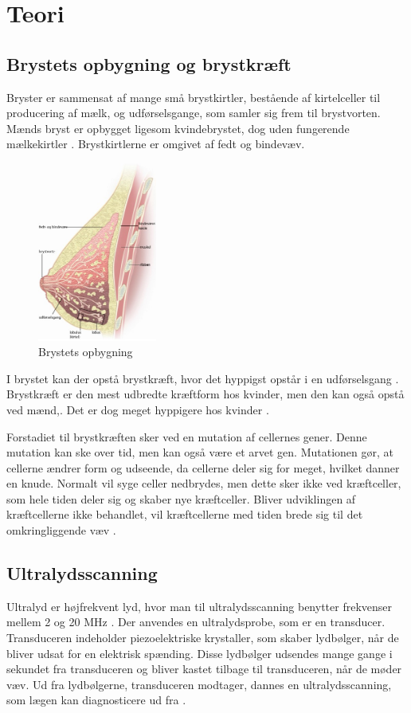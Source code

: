 \chapter{Teori}\label{Teori}

\section{Brystets opbygning og brystkræft}
Bryster er sammensat af mange små brystkirtler, bestående af kirtelceller til producering af mælk, og udførselsgange, som samler sig frem til brystvorten. Mænds bryst er opbygget ligesom kvindebrystet, dog uden fungerende mælkekirtler \cite{Mand}. Brystkirtlerne er omgivet af fedt og bindevæv\citep{Bryst}.

\begin{figure}[H]
    \centering
    \includegraphics[width=0.35\textwidth]{figurer/r/bryst}
    \caption{Brystets opbygning \citep{Bryst}}
    \label{Brystet}
\end{figure}

I brystet kan der opstå brystkræft, hvor det hyppigst opstår i en udførselsgang \citep{Bryst}. Brystkræft er den mest udbredte kræftform hos kvinder, men den kan også opstå ved mænd,. Det er dog meget hyppigere hos kvinder \cite{Mand}.

Forstadiet til brystkræften sker ved en mutation af cellernes gener. Denne mutation kan ske over tid, men kan også være et arvet gen. Mutationen gør, at cellerne ændrer form og udseende, da cellerne deler sig for meget, hvilket danner en knude. Normalt vil syge celler nedbrydes, men dette sker ikke ved kræftceller, som hele tiden deler sig og skaber nye kræftceller. Bliver udviklingen af kræftcellerne ikke behandlet, vil kræftcellerne med tiden brede sig til det omkringliggende væv \cite{Udvikling}. 

\section{Ultralydsscanning}
Ultralyd er højfrekvent lyd, hvor man til ultralydsscanning benytter frekvenser mellem 2 og 20 MHz \cite{HUSK}. Der anvendes en ultralydsprobe, som er en transducer. Transduceren indeholder piezoelektriske krystaller, som skaber lydbølger, når de bliver udsat for en elektrisk spænding. Disse lydbølger udsendes mange gange i sekundet fra transduceren og bliver kastet tilbage til transduceren, når de møder væv. Ud fra lydbølgerne, transduceren modtager, dannes en ultralydsscanning, som lægen kan diagnosticere ud fra \cite{Ultralydsscanning}.

